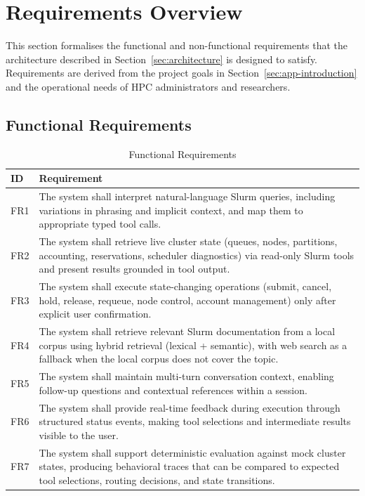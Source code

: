 \section{Requirements Overview}
\label{sec:requirements}

This section formalises the functional and non-functional requirements that the architecture described in Section~\ref{sec:architecture} is designed to satisfy. Requirements are derived from the project goals in Section~\ref{sec:app-introduction} and the operational needs of HPC administrators and researchers.

\subsection{Functional Requirements}

\begin{table}[H]
    \centering
    \caption{Functional Requirements}
    \label{tab:functional-requirements}
    \small
    \begin{tabular}{|l|p{10.5cm}|}
        \hline
        \textbf{ID} & \textbf{Requirement} \\
        \hline
        FR1 & The system shall interpret natural-language Slurm queries, including variations in phrasing and implicit context, and map them to appropriate typed tool calls. \\
        \hline
        FR2 & The system shall retrieve live cluster state (queues, nodes, partitions, accounting, reservations, scheduler diagnostics) via read-only Slurm tools and present results grounded in tool output. \\
        \hline
        FR3 & The system shall execute state-changing operations (submit, cancel, hold, release, requeue, node control, account management) only after explicit user confirmation. \\
        \hline
        FR4 & The system shall retrieve relevant Slurm documentation from a local corpus using hybrid retrieval (lexical + semantic), with web search as a fallback when the local corpus does not cover the topic. \\
        \hline
        FR5 & The system shall maintain multi-turn conversation context, enabling follow-up questions and contextual references within a session. \\
        \hline
        FR6 & The system shall provide real-time feedback during execution through structured status events, making tool selections and intermediate results visible to the user. \\
        \hline
        FR7 & The system shall support deterministic evaluation against mock cluster states, producing behavioral traces that can be compared to expected tool selections, routing decisions, and state transitions. \\
        \hline
    \end{tabular}
\end{table}

